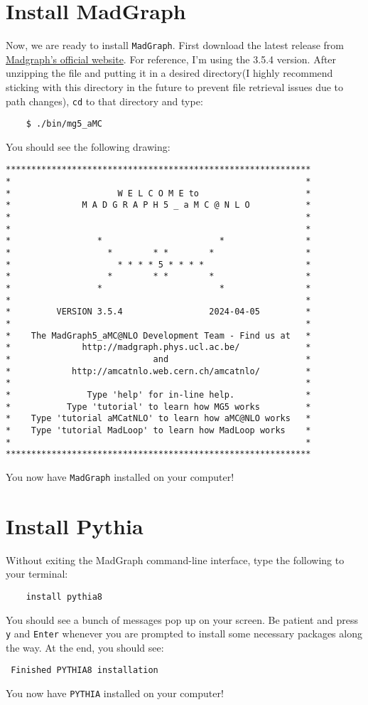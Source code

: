 \documentclass[12pt, english]{article}
\begin{document}
\section{Install MadGraph}
Now, we are ready to install \texttt{MadGraph}. First download the latest release from \href{https://launchpad.net/mg5amcnlo}{Madgraph's official website}. For reference, I'm using the 3.5.4 version. After unzipping the file and putting it in a desired directory(I highly recommend sticking with this directory in the future to prevent file retrieval issues due to path changes), \texttt{cd} to that directory and type:
\begin{lstlisting}
    $ ./bin/mg5_aMC
\end{lstlisting}
You should see the following drawing:
\begin{lstlisting}
************************************************************
*                                                          *
*                     W E L C O M E to                     *
*              M A D G R A P H 5 _ a M C @ N L O           *
*                                                          *
*                                                          *
*                 *                       *                *
*                   *        * *        *                  *
*                     * * * * 5 * * * *                    *
*                   *        * *        *                  *
*                 *                       *                *
*                                                          *
*         VERSION 3.5.4                 2024-04-05         *
*                                                          *
*    The MadGraph5_aMC@NLO Development Team - Find us at   *
*              http://madgraph.phys.ucl.ac.be/             *
*                            and                           *
*            http://amcatnlo.web.cern.ch/amcatnlo/         *
*                                                          *
*               Type 'help' for in-line help.              *
*           Type 'tutorial' to learn how MG5 works         *
*    Type 'tutorial aMCatNLO' to learn how aMC@NLO works   *
*    Type 'tutorial MadLoop' to learn how MadLoop works    *
*                                                          *
************************************************************
\end{lstlisting}
You now have \texttt{MadGraph} installed on your computer!

\section{Install Pythia}
Without exiting the MadGraph command-line interface, type the following to your terminal: 
\begin{lstlisting}
    install pythia8
\end{lstlisting}
You should see a bunch of messages pop up on your screen. Be patient and press \texttt{y} and \texttt{Enter} whenever you are prompted to install some necessary packages along the way. At the end, you should see:
\begin{lstlisting}
 Finished PYTHIA8 installation
\end{lstlisting}
You now have \texttt{PYTHIA} installed on your computer!
\end{document}
